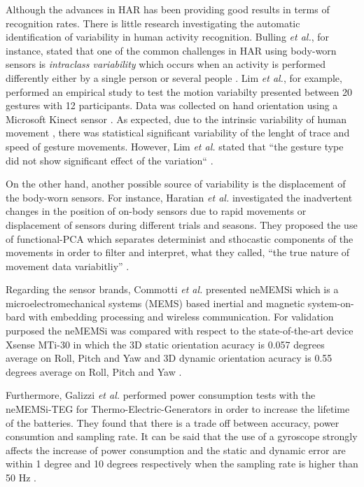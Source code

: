 \documentclass[11pt,journal,onecolumn,compsoc]{IEEEtran}
\begin{document}
Although the advances in HAR has been providing good results in terms of recognition rates.
There is little research investigating the automatic identification of variability in human activity recognition.
Bulling \textit{et al.}, for instance, stated that one of the common challenges in HAR 
using body-worn sensors is \textit{intraclass variability} which occurs when 
an activity is performed differently either by a single person or several people \cite{bulling2014} . 
Lim \textit{et al.}, for example, performed an empirical study to test the motion variabilty 
presented between 20 gestures with 12 participants. %
Data was collected on hand orientation using a Microsoft Kinect sensor \cite{Lim2012}. %
As expected, due to the intrinsic variability of human movement \cite{newell1993variability}, 
there was statistical significant variability of the lenght of trace and speed of gesture movements.
However, Lim \textit{et al.} stated that ``the gesture type did not show significant effect of the variation`` \cite{Lim2012}.

On the other hand, another possible source of variability is the displacement of the body-worn sensors. 
For instance, Haratian \textit{et al.} investigated the inadvertent changes in the position of on-body sensors 
due to rapid movements or displacement of sensors during different trials and seasons.
They proposed the use of functional-PCA 
which separates determinist and sthocastic components of the movements
in order to filter and interpret, what they called, ``the true nature of movement data variabitliy'' 
\cite{Haratian2012,Haratian2014,Haratian2016}.



Regarding the sensor brands, 
Commotti \textit{et al.} presented neMEMSi which is a microelectromechanical systems (MEMS)  based inertial and magnetic 
system-on-bard with embedding processing and wireless communication.
For validation purposed the neMEMSi was compared with respect to the state-of-the-art device Xsense MTi-30
in which the 3D static orientation acuracy is 0.057 degrees average on Roll, Pitch and Yaw 
and 3D dynamic orientation acuracy is 0.55 degrees average on Roll, Pitch and Yaw \cite{Comotti2014}.

Furthermore, Galizzi \textit{et al.} performed power consumption tests with the 
neMEMSi-TEG for Thermo-Electric-Generators in order to increase the lifetime of the batteries.
They found that there is a trade off between accuracy, power consumtion and sampling rate.
It can be said that the use of a gyroscope strongly affects the increase of power consumption
and the static and dynamic error are within 1 degree and 10 degrees respectively 
when the sampling rate is higher than 50 Hz \cite{Galizzi2015}.
\end{document}
